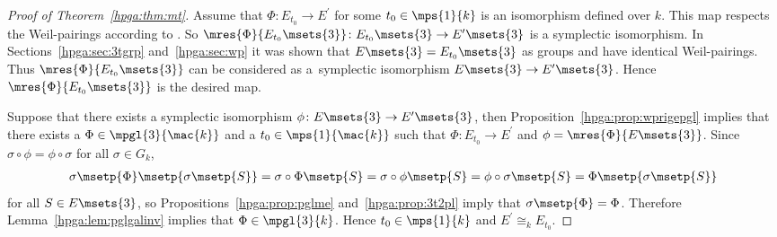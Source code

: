\begin{proof}[Proof of Theorem~\ref{hpga:thm:mt}] Assume that $\Phi\colon E_{t_0}\rightarrow E^\prime$ for some $t_0\in\mps{1}{k}$ is an isomorphism defined over $k$. This map respects the Weil-pairings according to
\cite[Proposition III.8.2]{silverman1985}. So $\mres{\Phi}{E_{t_0}\msets{3}}\colon E_{t_0}\msets{3}\rightarrow E^\prime\msets{3}$ is a symplectic isomorphism. In Sections~\ref{hpga:sec:3tgrp} and~\ref{hpga:sec:wp} it was shown that $E\msets {3}=E_{t_0}\msets{3}$ as groups and have identical Weil-pairings. Thus $\mres {\Phi}{E_{t_0}\msets{3}}$ can be considered as a~symplectic isomorphism $E\msets {3}\rightarrow E^\prime\msets{3}$. Hence $\mres{\Phi}{E_{t_0}\msets{3}}$ is the desired map.

Suppose that there exists a symplectic isomorphism $\phi\colon E\msets{3}\rightarrow E^\prime\msets{3}$, then Proposition~\ref{hpga:prop:wprigepgl} implies that there exists a $\Phi\in\mpgl{3}{\mac{k}}$ and a $t_0\in\mps{1}{\mac{k}}$ such that $\Phi\colon E_{t_0}\rightarrow E^\prime$ and $\phi=\mres{\Phi}{E\msets{3}}$. Since $\sigma\circ\phi=\phi\circ\sigma$ for all $\sigma\in G_k$,
\begin{gather*}
\sigma\msetp{\Phi}\msetp{\sigma\msetp{S}} =\sigma\circ\Phi\msetp{S} =\sigma\circ\phi\msetp{S} =\phi\circ\sigma\msetp{S} =\Phi\msetp{\sigma\msetp{S}}
\end{gather*}
for all $S\in E\msets{3}$, so Propositions~\ref{hpga:prop:pglme} and~\ref{hpga:prop:3t2pl} imply that $\sigma\msetp{\Phi}=\Phi$. Therefore Lemma~\ref{hpga:lem:pglgalinv} implies that $\Phi\in\mpgl{3}{k}$. Hence $t_0\in\mps{1}{k}$ and $E^\prime\cong_kE_{t_0}$.
\end{proof}
